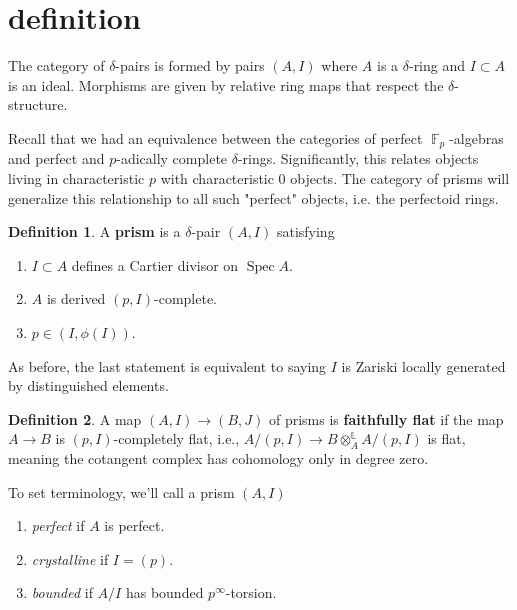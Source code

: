 \documentclass[12pt]{amsproc}
\theoremstyle{definition}
\newtheorem*{definition}{Definition}
\newcommand{\ra}{\rightarrow}
\DeclareMathOperator{\Spec}{Spec}
\DeclareMathOperator{\F}{\mathbb{F}}
\DeclareMathOperator{\DerivedL}{\mathbb{L}}
\begin{document}

\section{definition}

The category of $\delta$-pairs is formed by pairs $(A,I)$ where $A$ is a $\delta$-ring and $I\subset A$ is an ideal. Morphisms are given by relative ring maps that respect the $\delta$-structure.

Recall that we had an equivalence between the categories of perfect $\F_p$-algebras and perfect and $p$-adically complete $\delta$-rings. Significantly, this relates objects living in characteristic $p$ with characteristic 0 objects. The category of prisms will generalize this relationship to all such "perfect" objects, i.e. the perfectoid rings.

\begin{definition} A \textbf{prism} is a $\delta$-pair $(A,I)$ satisfying
\begin{enumerate}
\item $I\subset A$ defines a Cartier divisor on $\Spec A$.
\item $A$ is derived $(p,I)$-complete.
\item $p\in(I,\phi(I))$.
\end{enumerate}
\end{definition}

As before, the last statement is equivalent to saying $I$ is Zariski locally generated by distinguished elements.

\begin{definition} A map $(A,I)\ra (B,J)$ of prisms is \textbf{faithfully flat} if the map $A\ra B$ is $(p,I)$-completely flat, i.e., $A/(p,I)\ra B\otimes^{\DerivedL}_A A/(p,I)$ is flat, meaning the cotangent complex has cohomology only in degree zero.
\end{definition}

To set terminology, we'll call a prism $(A,I)$
\begin{enumerate}
\item \textit{perfect} if $A$ is perfect.
\item \textit{crystalline} if $I=(p)$.
\item \textit{bounded} if $A/I$ has bounded $p^\infty$-torsion.
\end{enumerate}
\end{document}
